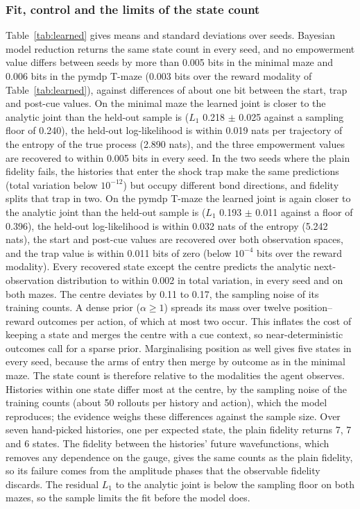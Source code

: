 \documentclass[pdflatex,sn-apa]{sn-jnl}%
\theoremstyle{definition}
\begin{document}
\subsubsection{Fit, control and the limits of the state count} Table~\ref{tab:learned} gives means and standard deviations over seeds. Bayesian model reduction returns the same state count in every seed, and no empowerment value differs between seeds by more than 0.005 bits in the minimal maze and 0.006 bits in the pymdp T-maze (0.003 bits over the reward modality of Table~\ref{tab:learned}), against differences of about one bit between the start, trap and post-cue values. On the minimal maze the learned joint is closer to the analytic joint than the held-out sample is ($L_1$ 0.218 $\pm$ 0.025 against a sampling floor of 0.240), the held-out log-likelihood is within 0.019 nats per trajectory of the entropy of the true process (2.890 nats), and the three empowerment values are recovered to within 0.005 bits in every seed. In the two seeds where the plain fidelity fails, the histories that enter the shock trap make the same predictions (total variation below $10^{-12}$) but occupy different bond directions, and fidelity splits that trap in two. On the pymdp T-maze the learned joint is again closer to the analytic joint than the held-out sample is ($L_1$ 0.193 $\pm$ 0.011 against a floor of 0.396), the held-out log-likelihood is within 0.032 nats of the entropy (5.242 nats), the start and post-cue values are recovered over both observation spaces, and the trap value is within 0.011 bits of zero (below $10^{-4}$ bits over the reward modality). Every recovered state except the centre predicts the analytic next-observation distribution to within 0.002 in total variation, in every seed and on both mazes. The centre deviates by 0.11 to 0.17, the sampling noise of its training counts. A dense prior ($\alpha \ge 1$) spreads its mass over twelve position--reward outcomes per action, of which at most two occur. This inflates the cost of keeping a state and merges the centre with a cue context, so near-deterministic outcomes call for a sparse prior. Marginalising position as well gives five states in every seed, because the arms of entry then merge by outcome as in the minimal maze. The state count is therefore relative to the modalities the agent observes. Histories within one state differ most at the centre, by the sampling noise of the training counts (about 50 rollouts per history and action), which the model reproduces; the evidence weighs these differences against the sample size. Over seven hand-picked histories, one per expected state, the plain fidelity returns 7, 7 and 6 states. The fidelity between the histories' future wavefunctions, which removes any dependence on the gauge, gives the same counts as the plain fidelity, so its failure comes from the amplitude phases that the observable fidelity discards. The residual $L_1$ to the analytic joint is below the sampling floor on both mazes, so the sample limits the fit before the model does.
\end{document}
